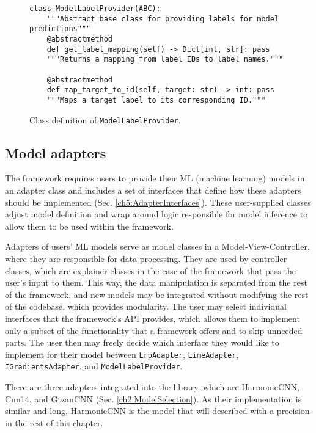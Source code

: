 \documentclass[
    bindingoffset=5mm,  %
    footnoteindent=3mm, %
    hyphenation=true    %
]{src/wut-thesis}
\begin{document}
\begin{figure}%
\begin{verbatim}
class ModelLabelProvider(ABC):
    """Abstract base class for providing labels for model predictions"""
    @abstractmethod
    def get_label_mapping(self) -> Dict[int, str]: pass
    """Returns a mapping from label IDs to label names."""

    @abstractmethod
    def map_target_to_id(self, target: str) -> int: pass
    """Maps a target label to its corresponding ID."""
\end{verbatim}
\caption{Class definition of \texttt{ModelLabelProvider}.}
\label{fig:ModelLabelProvider}
\end{figure}

\subsection{Model adapters} \label{ch5:ModelAdapters}

The framework requires users to provide their ML (machine learning) models
in an adapter class and includes a set of interfaces that define how these
adapters should be implemented (Sec. \ref{ch5:AdapterInterfaces}). These user-supplied classes adjust
model definition and wrap around logic responsible for model inference to allow
them to be used within the framework.

Adapters of users’ ML models serve as model classes in a Model-View-Controller,
where they are responsible for data processing. They are used by controller classes,
which are explainer classes in the case of the framework that pass the user’s input to them.
This way, the data manipulation is separated from the rest of the framework,
and new models may be integrated without modifying the rest of the codebase, which provides modularity.
The user may select individual interfaces that the framework’s API provides,
which allows them to implement only a subset of the functionality that a framework
offers and to skip unneeded parts. The user then may freely decide which interface
they would like to implement for their model between 
\texttt{LrpAdapter}, \texttt{LimeAdapter}, \texttt{IGradientsAdapter}, and \texttt{ModelLabelProvider}.

There are three adapters integrated into the library, which are HarmonicCNN, Cnn14, and GtzanCNN
(Sec. \ref{ch2:ModelSelection}). As their implementation is similar and long, HarmonicCNN is the model
that will described with a precision in the rest of this chapter.
\end{document}
